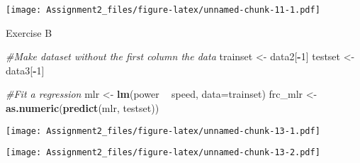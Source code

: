 \documentclass[
]{article}
\newenvironment{Shaded}{\begin{snugshade}}{\end{snugshade}}
\newcommand{\CommentTok}[1]{\textcolor[rgb]{0.56,0.35,0.01}{\textit{#1}}}
\newcommand{\DataTypeTok}[1]{\textcolor[rgb]{0.13,0.29,0.53}{#1}}
\newcommand{\DecValTok}[1]{\textcolor[rgb]{0.00,0.00,0.81}{#1}}
\newcommand{\KeywordTok}[1]{\textcolor[rgb]{0.13,0.29,0.53}{\textbf{#1}}}
\newcommand{\NormalTok}[1]{#1}
\newcommand{\OperatorTok}[1]{\textcolor[rgb]{0.81,0.36,0.00}{\textbf{#1}}}
\newcommand{\StringTok}[1]{\textcolor[rgb]{0.31,0.60,0.02}{#1}}
\begin{document}
\texttt{[image: Assignment2\_files/figure-latex/unnamed-chunk-11-1.pdf]}

Exercise B

\begin{Shaded}
\begin{Highlighting}[]
\CommentTok{#Make dataset without the first column the data}
\NormalTok{trainset <-}\StringTok{ }\NormalTok{data2[}\OperatorTok{-}\DecValTok{1}\NormalTok{]}
\NormalTok{testset <-}\StringTok{ }\NormalTok{data3[}\OperatorTok{-}\DecValTok{1}\NormalTok{]}

\CommentTok{#Fit a regression}
\NormalTok{mlr <-}\StringTok{ }\KeywordTok{lm}\NormalTok{(power }\OperatorTok{~}\StringTok{ }\NormalTok{speed, }\DataTypeTok{data=}\NormalTok{trainset)}
\NormalTok{frc_mlr <-}\StringTok{ }\KeywordTok{as.numeric}\NormalTok{(}\KeywordTok{predict}\NormalTok{(mlr, testset))}
\end{Highlighting}
\end{Shaded}

\begin{Shaded}
\end{Shaded}

\texttt{[image: Assignment2\_files/figure-latex/unnamed-chunk-13-1.pdf]}

\begin{Shaded}
\end{Shaded}

\texttt{[image: Assignment2\_files/figure-latex/unnamed-chunk-13-2.pdf]}

\begin{Shaded}
\end{Shaded}
\end{document}
